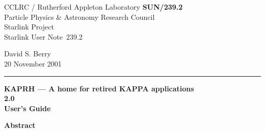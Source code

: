 \documentclass[twoside,11pt]{article}
\newcommand{\stardoccategory}  {Starlink User Note}
\newcommand{\stardocinitials}  {SUN}
\newcommand{\stardocnumber}    {239.2}
\newcommand{\stardocauthors}   {David S. Berry}
\newcommand{\stardocdate}      {20 November 2001}
\newcommand{\stardoctitle}     {KAPRH ---  A home for retired KAPPA applications}
\newcommand{\stardocversion}   {2.0}
\newcommand{\stardocmanual}    {User's Guide}
\newcommand{\stardocname}{\stardocinitials /\stardocnumber}
\newenvironment{latexonly}{}{}
\begin{document}
\thispagestyle{empty}

\begin{latexonly}
   CCLRC / {\sc Rutherford Appleton Laboratory} \hfill {\bf \stardocname}\\
   {\large Particle Physics \& Astronomy Research Council}\\
   {\large Starlink Project\\}
   {\large \stardoccategory\ \stardocnumber}
   \begin{flushright}
   \stardocauthors\\
   \stardocdate
   \end{flushright}
   \vspace{-4mm}
   \rule{\textwidth}{0.5mm}
   \vspace{5mm}
   \begin{center}
   {\Huge\bf  \stardoctitle \\ [2.5ex]}
   {\LARGE\bf \stardocversion \\ [4ex]}
   {\Huge\bf  \stardocmanual}
   \end{center}
   \vspace{5mm}

   \vspace{10mm}
   \begin{center}
      {\Large\bf Abstract}
   \end{center}
\end{latexonly}
\end{document}
